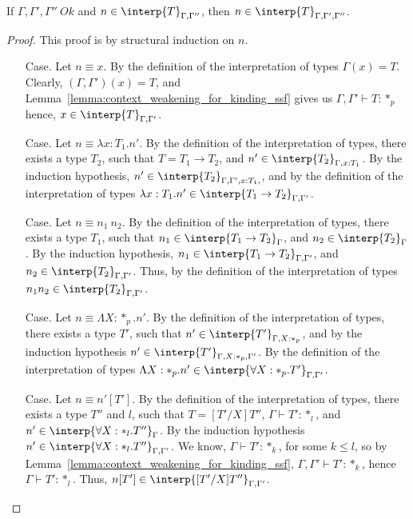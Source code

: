 \begin{lemma}
  If $\Gamma,\Gamma',\Gamma''\ Ok$ and $n \in \interp{T}_{\Gamma,\Gamma''}$, then 
  $n \in \interp{T}_{\Gamma,\Gamma',\Gamma''}$.
  \label{lemma:context_weakening_interpretations_ssf}
\end{lemma}
\begin{proof}
  This proof is by structural induction on $n$.
\begin{itemize}
\item[Case.]  Let $n \equiv x$.  By the definition of the interpretation of types 
  $\Gamma(x) = T$.  Clearly,
  $(\Gamma,\Gamma')(x) = T$, and Lemma~\ref{lemma:context_weakening_for_kinding_ssf} gives 
  us $\Gamma,\Gamma' \vdash T:*_p$ hence, $x \in \interp{T}_{\Gamma,\Gamma'}$.
  
\item[Case.]  Let $n \equiv \lambda x:T_1.n'$.  By the definition of the interpretation of 
  types, there exists a type $T_2$, such that $T = T_1 \rightarrow T_2$, and 
  $n' \in \interp{T_2}_{\Gamma,x:T_1}$.  By
  the induction hypothesis, $n' \in \interp{T_2}_{\Gamma,\Gamma',x:T_1,}$, and by the 
  definition of the interpretation of types 
  $\lambda x:T_1.n' \in \interp{T_1 \rightarrow T_2}_{\Gamma,\Gamma'}$.
  
\item[Case.]  Let $n \equiv n_1\ n_2$.  By the definition of the interpretation of types, there 
  exists a type $T_1$, such that 
  $n_1 \in \interp{T_1 \rightarrow T_2}_\Gamma$, and $n_2 \in \interp{T_2}_\Gamma$.  By 
  the induction hypothesis,
  $n_1 \in \interp{T_1 \rightarrow T_2}_{\Gamma,\Gamma'}$, and 
  $n_2 \in \interp{T_2}_{\Gamma,\Gamma'}$.  Thus, by
  the definition of the interpretation of types $n_1n_2 \in \interp{T_2}_{\Gamma,\Gamma'}$.
  
\item[Case.]  Let $n \equiv \Lambda X:*_p.n'$.  By the definition of the interpretation of 
  types, there exists a type $T'$, such that
  $n' \in \interp{T'}_{\Gamma,X:*_p}$, and by the induction hypothesis 
  $n' \in \interp{T'}_{\Gamma,X:*_p,\Gamma'}$.  By the
  definition of the interpretation of types 
  $\Lambda X:*_p.n' \in \interp{\forall X:*_p.T'}_{\Gamma,\Gamma'}$.
  
\item[Case.]  Let $n \equiv n'[T']$.  By the definition of the interpretation of types, 
  there exists a type $T''$ and $l$, 
  such that $T = [T'/X]T''$, $\Gamma \vdash T':*_l$, and 
  $n' \in \interp{\forall X:*_l.T''}_{\Gamma}$.  By the induction
  hypothesis $n' \in \interp{\forall X:*_l.T''}_{\Gamma,\Gamma'}$.  We know, 
  $\Gamma \vdash T':*_k$, for some $k \leq l$, so by
  Lemma~\ref{lemma:context_weakening_for_kinding_ssf}, $\Gamma,\Gamma' \vdash T':*_k$, 
  hence 
  $\Gamma \vdash T':*_l$. Thus, $n[T'] \in
  \interp{[T'/X]T''}_{\Gamma,\Gamma'}$.
\end{itemize}
\end{proof}
